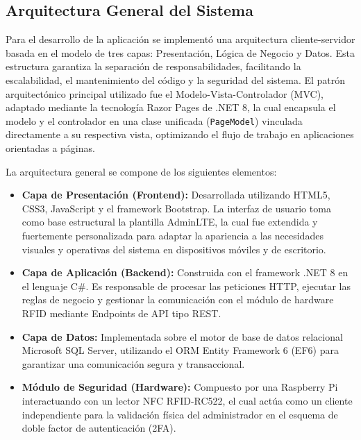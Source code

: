 
\subsection{Arquitectura General del Sistema}
Para el desarrollo de la aplicación se implementó una arquitectura cliente-servidor basada en el modelo de tres capas: Presentación, Lógica de Negocio y Datos. Esta estructura garantiza la separación de responsabilidades, facilitando la escalabilidad, el mantenimiento del código y la seguridad del sistema. El patrón arquitectónico principal utilizado fue el Modelo-Vista-Controlador (MVC), adaptado mediante la tecnología Razor Pages de .NET 8, la cual encapsula el modelo y el controlador en una clase unificada (\texttt{PageModel}) vinculada directamente a su respectiva vista, optimizando el flujo de trabajo en aplicaciones orientadas a páginas.

La arquitectura general se compone de los siguientes elementos:

\begin{itemize}
	\item \textbf{Capa de Presentación (Frontend):} Desarrollada utilizando HTML5, CSS3, JavaScript y el framework Bootstrap. La interfaz de usuario toma como base estructural la plantilla AdminLTE, la cual fue extendida y fuertemente personalizada para adaptar la apariencia a las necesidades visuales y operativas del sistema en dispositivos móviles y de escritorio.
	\item \textbf{Capa de Aplicación (Backend):} Construida con el framework .NET 8 en el lenguaje C\#. Es responsable de procesar las peticiones HTTP, ejecutar las reglas de negocio y gestionar la comunicación con el módulo de hardware RFID mediante Endpoints de API tipo REST.
	\item \textbf{Capa de Datos:} Implementada sobre el motor de base de datos relacional Microsoft SQL Server, utilizando el ORM Entity Framework 6 (EF6) para garantizar una comunicación segura y transaccional.
	\item \textbf{Módulo de Seguridad (Hardware):} Compuesto por una Raspberry Pi interactuando con un lector NFC RFID-RC522, el cual actúa como un cliente independiente para la validación física del administrador en el esquema de doble factor de autenticación (2FA).
\end{itemize}

